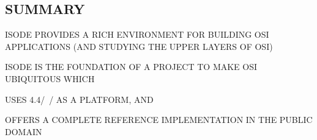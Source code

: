 \begin{bwslide}
\part*	{SUMMARY}\bf

\begin{nrtc}
\item	ISODE PROVIDES A RICH ENVIRONMENT FOR BUILDING OSI APPLICATIONS
	(AND STUDYING THE UPPER LAYERS OF OSI)

\item	ISODE IS THE FOUNDATION OF A PROJECT TO MAKE OSI UBIQUITOUS WHICH
    \begin{nrtc}
    \item	USES 4.4\bsd/~\unix/ AS A PLATFORM, AND

    \item	OFFERS A COMPLETE REFERENCE IMPLEMENTATION IN THE PUBLIC DOMAIN
    \end{nrtc}
\end{nrtc}
\end{bwslide}



